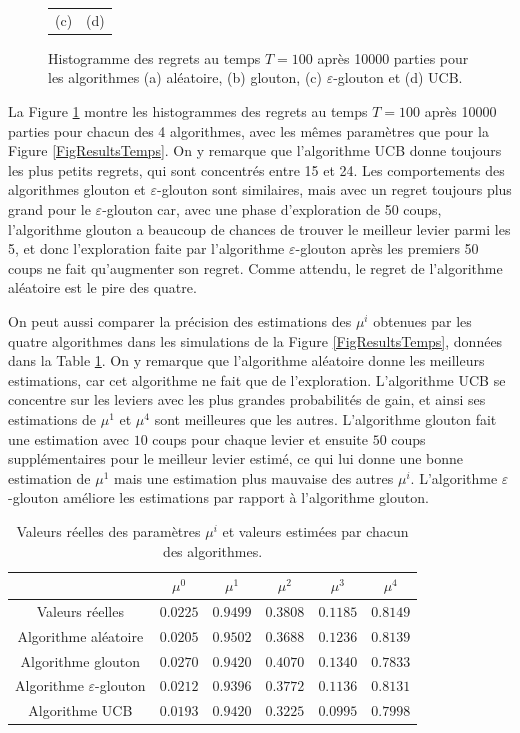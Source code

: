 \documentclass[a4paper,12pt]{article}
\begin{document}
\begin{figure}[ht]
\begin{tabular}{@{} >{\centering} m{} @{} >{\centering} m{} @{}}
(c) & (d) \tabularnewline
\end{tabular}
\caption{Histogramme des regrets au temps $T = 100$ après 10000 parties pour les algorithmes (a) aléatoire, (b) glouton, (c) $\varepsilon$-glouton et (d) UCB.}
\label{FigHist}
\end{figure}

La Figure \ref{FigHist} montre les histogrammes des regrets au temps $T = 100$ après 10000 parties pour chacun des 4 algorithmes, avec les mêmes paramètres que pour la Figure \ref{FigResultsTemps}. On y remarque que l'algorithme UCB donne toujours les plus petits regrets, qui sont concentrés entre 15 et 24. Les comportements des algorithmes glouton et $\varepsilon$-glouton sont similaires, mais avec un regret toujours plus grand pour le $\varepsilon$-glouton car, avec une phase d'exploration de 50 coups, l'algorithme glouton a beaucoup de chances de trouver le meilleur levier parmi les 5, et donc l'exploration faite par l'algorithme $\varepsilon$-glouton après les premiers 50 coups ne fait qu'augmenter son regret. Comme attendu, le regret de l'algorithme aléatoire est le pire des quatre.

On peut aussi comparer la précision des estimations des $\mu^i$ obtenues par les quatre algorithmes dans les simulations de la Figure \ref{FigResultsTemps}, données dans la Table \ref{TabMu}. On y remarque que l'algorithme aléatoire donne les meilleurs estimations, car cet algorithme ne fait que de l'exploration. L'algorithme UCB se concentre sur les leviers avec les plus grandes probabilités de gain, et ainsi ses estimations de $\mu^1$ et $\mu^4$ sont meilleures que les autres. L'algorithme glouton fait une estimation avec $10$ coups pour chaque levier et ensuite $50$ coups supplémentaires pour le meilleur levier estimé, ce qui lui donne une bonne estimation de $\mu^1$ mais une estimation plus mauvaise des autres $\mu^i$. L'algorithme $\varepsilon$-glouton améliore les estimations par rapport à l'algorithme glouton.

\begin{table}[ht]
\centering
\begin{tabular}{cccccc}
\hline\hline
 & $\mu^0$ & $\mu^1$ & $\mu^2$ & $\mu^3$ & $\mu^4$ \tabularnewline
\hline\hline
Valeurs réelles & $0.0225$ & $0.9499$ & $0.3808$ & $0.1185$ & $0.8149$ \tabularnewline
\hline
Algorithme aléatoire & $0.0205$ & $0.9502$ & $0.3688$ & $0.1236$ & $0.8139$ \tabularnewline
Algorithme glouton & $0.0270$ & $0.9420$ & $0.4070$ & $0.1340$ & $0.7833$\tabularnewline
Algorithme $\varepsilon$-glouton & $0.0212$ & $0.9396$ & $0.3772$ & $0.1136$ & $0.8131$\tabularnewline
Algorithme UCB & $0.0193$ & $0.9420$ & $0.3225$ & $0.0995$ & $0.7998$\tabularnewline
\hline\hline
\end{tabular}
\caption{Valeurs réelles des paramètres $\mu^i$ et valeurs estimées par chacun des algorithmes.}
\label{TabMu}
\end{table}
\end{document}
